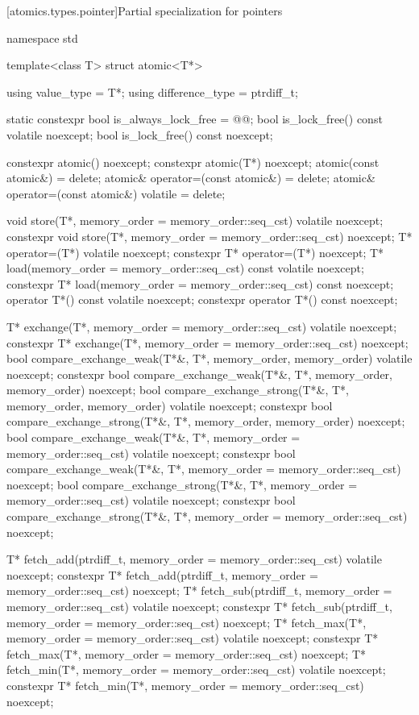[atomics.types.pointer]{Partial specialization for pointers}
%

\begin{codeblock}
namespace std {
  template<class T> struct atomic<T*> {
    using value_type = T*;
    using difference_type = ptrdiff_t;

    static constexpr bool is_always_lock_free = @@;
    bool is_lock_free() const volatile noexcept;
    bool is_lock_free() const noexcept;

    constexpr atomic() noexcept;
    constexpr atomic(T*) noexcept;
    atomic(const atomic&) = delete;
    atomic& operator=(const atomic&) = delete;
    atomic& operator=(const atomic&) volatile = delete;

    void store(T*, memory_order = memory_order::seq_cst) volatile noexcept;
    constexpr void store(T*, memory_order = memory_order::seq_cst) noexcept;
    T* operator=(T*) volatile noexcept;
    constexpr T* operator=(T*) noexcept;
    T* load(memory_order = memory_order::seq_cst) const volatile noexcept;
    constexpr T* load(memory_order = memory_order::seq_cst) const noexcept;
    operator T*() const volatile noexcept;
    constexpr operator T*() const noexcept;

    T* exchange(T*, memory_order = memory_order::seq_cst) volatile noexcept;
    constexpr T* exchange(T*, memory_order = memory_order::seq_cst) noexcept;
    bool compare_exchange_weak(T*&, T*, memory_order, memory_order) volatile noexcept;
    constexpr bool compare_exchange_weak(T*&, T*, memory_order, memory_order) noexcept;
    bool compare_exchange_strong(T*&, T*, memory_order, memory_order) volatile noexcept;
    constexpr bool compare_exchange_strong(T*&, T*, memory_order, memory_order) noexcept;
    bool compare_exchange_weak(T*&, T*,
                               memory_order = memory_order::seq_cst) volatile noexcept;
    constexpr bool compare_exchange_weak(T*&, T*,
                               memory_order = memory_order::seq_cst) noexcept;
    bool compare_exchange_strong(T*&, T*,
                                 memory_order = memory_order::seq_cst) volatile noexcept;
    constexpr bool compare_exchange_strong(T*&, T*,
                                 memory_order = memory_order::seq_cst) noexcept;

    T* fetch_add(ptrdiff_t, memory_order = memory_order::seq_cst) volatile noexcept;
    constexpr T* fetch_add(ptrdiff_t, memory_order = memory_order::seq_cst) noexcept;
    T* fetch_sub(ptrdiff_t, memory_order = memory_order::seq_cst) volatile noexcept;
    constexpr T* fetch_sub(ptrdiff_t, memory_order = memory_order::seq_cst) noexcept;
    T* fetch_max(T*, memory_order = memory_order::seq_cst) volatile noexcept;
    constexpr T* fetch_max(T*, memory_order = memory_order::seq_cst) noexcept;
    T* fetch_min(T*, memory_order = memory_order::seq_cst) volatile noexcept;
    constexpr T* fetch_min(T*, memory_order = memory_order::seq_cst) noexcept;

}}
\end{codeblock}
